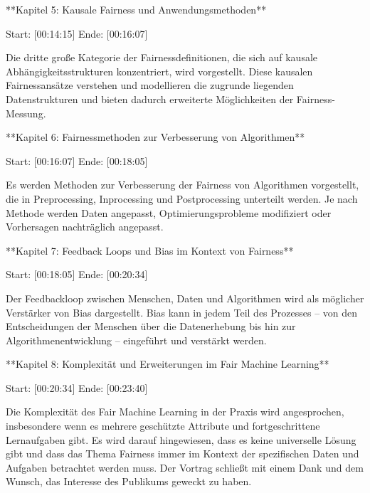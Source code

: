 \documentclass[12pt]{article}
\begin{document}
**Kapitel 5: Kausale Fairness und Anwendungsmethoden**

Start: [00:14:15]  
Ende: [00:16:07]  

Die dritte große Kategorie der Fairnessdefinitionen, die sich auf kausale Abhängigkeitsstrukturen konzentriert, wird vorgestellt. Diese kausalen Fairnessansätze verstehen und modellieren die zugrunde liegenden Datenstrukturen und bieten dadurch erweiterte Möglichkeiten der Fairness-Messung.

**Kapitel 6: Fairnessmethoden zur Verbesserung von Algorithmen**

Start: [00:16:07]  
Ende: [00:18:05]  

Es werden Methoden zur Verbesserung der Fairness von Algorithmen vorgestellt, die in Preprocessing, Inprocessing und Postprocessing unterteilt werden. Je nach Methode werden Daten angepasst, Optimierungsprobleme modifiziert oder Vorhersagen nachträglich angepasst.

**Kapitel 7: Feedback Loops und Bias im Kontext von Fairness**

Start: [00:18:05]  
Ende: [00:20:34]  

Der Feedbackloop zwischen Menschen, Daten und Algorithmen wird als möglicher Verstärker von Bias dargestellt. Bias kann in jedem Teil des Prozesses – von den Entscheidungen der Menschen über die Datenerhebung bis hin zur Algorithmenentwicklung – eingeführt und verstärkt werden.

**Kapitel 8: Komplexität und Erweiterungen im Fair Machine Learning**

Start: [00:20:34]  
Ende: [00:23:40]  

Die Komplexität des Fair Machine Learning in der Praxis wird angesprochen, insbesondere wenn es mehrere geschützte Attribute und fortgeschrittene Lernaufgaben gibt. Es wird darauf hingewiesen, dass es keine universelle Lösung gibt und dass das Thema Fairness immer im Kontext der spezifischen Daten und Aufgaben betrachtet werden muss. Der Vortrag schließt mit einem Dank und dem Wunsch, das Interesse des Publikums geweckt zu haben.
\end{document}
